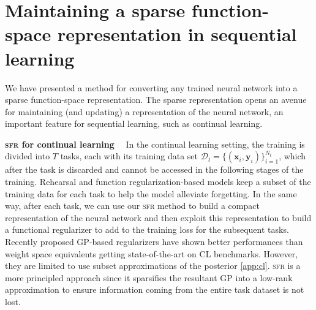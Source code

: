\documentclass{article}
\renewcommand{\paragraph}[1]{{\bf #1}~~}
\newcommand{\our}{\textsc{sfr}\xspace}
\newcommand{\dataset}{\ensuremath{\mathcal{D}}}
\begin{document}
\section{Maintaining a sparse function-space representation in sequential learning}
\label{sec:sequential}
%
We have presented a method for converting any trained neural network into a sparse function-space representation. The sparse representation opens an avenue for maintaining (and updating) a representation of the neural network, an important feature for sequential learning, such as continual learning.



\paragraph{\our for continual learning}
In the continual learning setting, the training is divided into $T$ tasks, each with its training data set $\dataset_t = \{(\mathbf{x}_{i}, \mathbf{y}_{i})\}_{i=1}^{N_t}$, which after the task is discarded and cannot be accessed in the following stages of the training. Rehearsal and function regularization-based models keep a subset of the training data for each task to help the model alleviate forgetting. In the same way, after each task, we can use our \our method to build a compact representation of the neural network and then exploit this representation to build a functional regularizer to add to the training loss for the subsequent tasks. Recently proposed GP-based regularizers \cite{ pan2020continual, rudner2022continual} have shown better performances than weight space equivalents getting state-of-the-art on CL benchmarks. However, they are limited to use subset approximations of the posterior \cref{app:cl}.
\our is a more principled approach since it sparsifies the resultant GP into a low-rank approximation to ensure information coming from the entire task dataset is not lost. %
\end{document}
